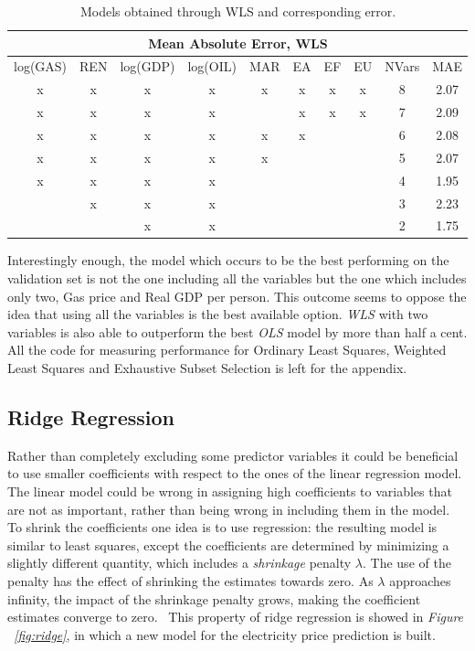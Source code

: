 \documentclass[a4paper,12pt]{book}
\begin{document}
\begin{table}[tb]
\begin{center}
\begin{tabular}{|c|c|c|c|c|c|c|c|c|c|}
\hline
\multicolumn{10}{|c|}{Mean Absolute Error, WLS}\\
\hline
log(GAS)&REN&log(GDP)&log(OIL)&MAR&EA&EF&EU&NVars&MAE\\
\hline
x&x&x&x&x&x&x&x&8&2.07\\
x&x&x&x&&x&x&x&7&2.09\\
x&x&x&x&x&x&&&6&2.08\\
x&x&x&x&x&&&&5&2.07\\
x&x&x&x&&&&&4&1.95\\
&x&x&x&&&&&3&2.23\\
&&x&x&&&&&2&1.75\\
\hline
\end{tabular}
\caption{Models obtained through WLS and corresponding error.}
\label{Tab:mwls}
\end{center}
\end{table}

Interestingly enough, the model which occurs to be the best performing on the validation set is not the one including all the variables but the one which includes only two, Gas price and Real GDP per person. This outcome seems to oppose the idea that using all the variables is the best available option. \textit{WLS} with two variables is also able to outperform the best \textit{OLS} model by more than half a cent. All the code for measuring performance for Ordinary Least Squares, Weighted Least Squares and Exhaustive Subset Selection is left for the appendix.

\subsection{Ridge Regression}

Rather than completely excluding some predictor variables it could be beneficial to use smaller coefficients with respect to the ones of the linear regression model. The linear model could be wrong in assigning high coefficients to variables that are not as important, rather than being wrong in including them in the model. To shrink the coefficients one idea is to use  regression: the resulting model is similar to least squares, except the coefficients are determined by minimizing a slightly different quantity, which includes a \textit{shrinkage} penalty $\lambda$. The use of the penalty has the effect of shrinking the estimates towards zero. As $\lambda$ approaches infinity, the impact of the shrinkage penalty grows, making the coefficient estimates converge to zero.~\cite{james2013introduction} This property of ridge regression is showed in \textit{Figure ~\ref{fig:ridge}}, in which a new model for the electricity price prediction is built.
\end{document}
